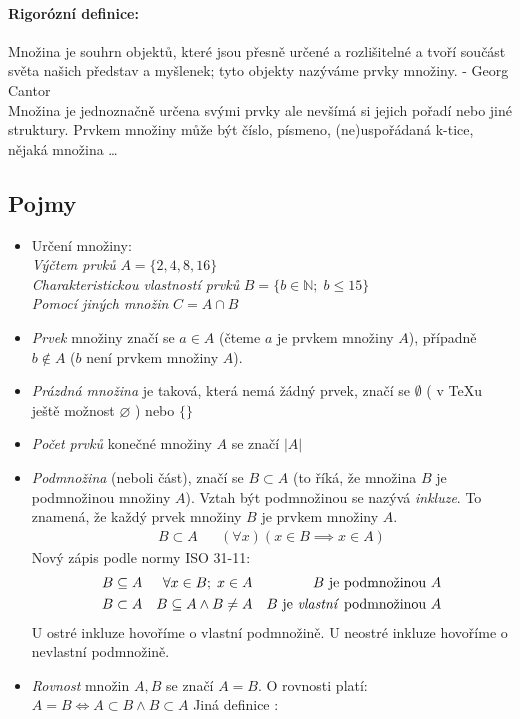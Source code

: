 \documentclass[12pt]{article}
\begin{document}
\paragraph{Rigorózní definice:\\}
Množina je souhrn objektů, které jsou přesně určené a rozlišitelné a tvoří součást světa našich představ a myšlenek; tyto objekty nazýváme prvky množiny. - Georg Cantor \\
Množina je jednoznačně určena svými prvky ale nevšímá si jejich pořadí nebo jiné struktury. Prvkem množiny může být číslo, písmeno, (ne)uspořádaná k-tice, nějaká množina \dots
\subsection{Pojmy}
\begin{itemize}
\item Určení množiny:\\  \emph{Výčtem prvků} $A = \{2,4,8,16\} ­$\\
\emph{Charakteristickou vlastností prvků} $B = \{b \in \mathbb{N}; \; b \leq15 \}$\\
\emph{Pomocí jiných množin} $C = A \cap B$
\item \emph{Prvek} množiny značí se $a \in A$ (čteme $a$ je prvkem množiny $A$), případně $b \notin A$ ($b$ není prvkem množiny $A$).
\item \emph{Prázdná množina} je taková, která nemá žádný prvek, značí se $\emptyset$ ( v \TeX u ještě možnost $\varnothing$ ) nebo $\{ \}$
\item \emph{Počet prvků} konečné množiny $A$ se značí $|A|$
\item \emph{Podmnožina} (neboli část), značí se $ B \subset A$ (to říká, že množina $B$ je podmnožinou množiny $A$).  Vztah být podmnožinou se nazývá \emph{inkluze}. To znamená, že každý prvek množiny $B$ je prvkem množiny $A$.
\begin{align}
B \subset A &&( \forall x) \left( x \in B  \implies x \in A \right)
\end{align}
Nový zápis podle normy ISO 31-11:
\begin{align}
B \subseteq A && \forall x \in B; \; x \in A && \text{$B$ je podmnožinou  $A$}\\
B \subset A && B \subseteq A \land B \neq A && \text{$B$ je \emph{vlastní} podmnožinou $A$}
\end{align}
U ostré inkluze hovoříme o vlastní podmnožině. U neostré inkluze hovoříme o nevlastní podmnožině.
\item \emph{Rovnost} množin $A,B$ se značí $A=B$. O rovnosti platí: $A = B \iff A \subset B \land B \subset A$ Jiná definice :

\end{itemize}
\end{document}
